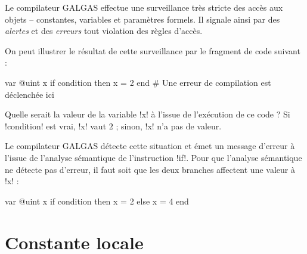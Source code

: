 
Le compilateur GALGAS effectue une surveillance très stricte des accès aux objets -- constantes, variables et paramètres formels. Il signale ainsi par des \emph{alertes} et des \emph{erreurs} tout violation des règles d'accès.

On peut illustrer le résultat de cette surveillance par le fragment de code suivant :
\begin{galgas}
var @uint x
if condition then
  x = 2
end # Une erreur de compilation est déclenchée ici
\end{galgas}

Quelle serait la valeur de la variable \ggs!x! à l'issue de l'exécution de ce code ? Si \ggs!condition! est vrai, \ggs!x! vaut $2$ ; sinon, \ggs!x! n'a pas de valeur.

Le compilateur GALGAS détecte cette situation et émet un message d'erreur à l'issue de l'analyse sémantique de l'instruction \ggs!if!. Pour que l'analyse sémantique ne détecte pas d'erreur, il faut soit que les deux branches affectent une valeur à \ggs!x! :

\begin{galgas}
var @uint x
if condition then
  x = 2
else
  x = 4
end
\end{galgas}












\section{Constante locale}

